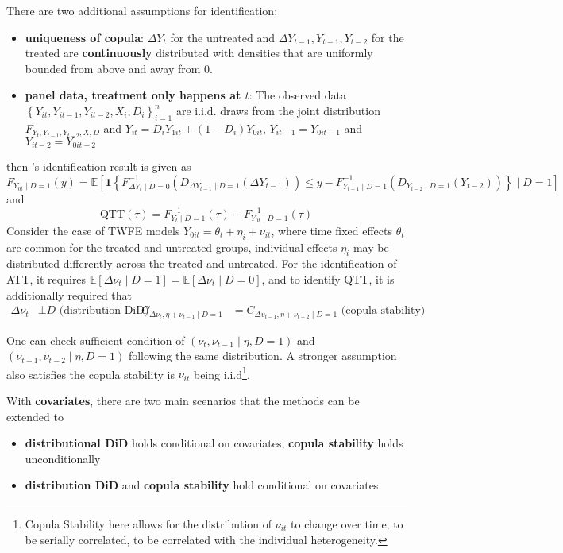 \documentclass[twoside]{article}
\begin{document}
There are two additional assumptions for identification:
\begin{itemize}
    \item \textbf{uniqueness of copula}: $\Delta Y_t$ for the untreated and $\Delta Y_{t-1},Y_{t-1},Y_{t-2}$ for the treated are \textbf{continuously} distributed with densities that are uniformly bounded from above and away from 0.
    \item \textbf{panel data, treatment only happens at $t$}: The observed data $\left\{ Y_{it},Y_{it-1},Y_{it-2},X_i,D_i \right\}^n_{i=1}$ are i.i.d. draws from the joint distribution $F_{Y_t,Y_{t-1},Y_{t-2},X,D}$ and $Y_{it}=D_iY_{1it}+(1-D_i)Y_{0it}$, $Y_{it-1}=Y_{0it-1}$ and $Y_{it-2}=Y_{0it-2}$
\end{itemize}

then \citet{callaway2019quantile}'s identification result is given as 
$$ F_{Y_{0t}\mid D=1}(y) = \mathbb{E}\left[\mathbf{1}\left\{ F^{-1}_{\Delta Y_t\mid D=0} \left(D_{\Delta Y_{t-1}\mid D=1} \left(\Delta Y_{t-1}\right)\right) \leq y-F^{-1}_{Y_{t-1}\mid D=1}\left(D_{Y_{t-2}\mid D=1}(Y_{t-2})\right) \right\} \mid D=1 \right] $$
and 
$$ \mathrm{QTT}(\tau) = F^{-1}_{Y_t\mid D=1}(\tau) - F^{-1}_{Y_{0t}\mid D=1}(\tau) $$
Consider the case of TWFE models $Y_{0it} = \theta_t + \eta_i + \nu_{it}$, where time fixed effects $\theta_t$ are common for the treated and untreated groups, individual effects $\eta_i$ may be distributed differently across the treated and untreated. For the identification of ATT, it requires $\mathbb{E}\left[\Delta \nu_t\mid D=1\right] = \mathbb{E}\left[\Delta \nu_t\mid D=0\right]$, and to identify QTT, 
it is additionally required that 
\begin{align*}
    \Delta \nu_t &\bot D \text{ (distribution DiD)}  & C_{\Delta \nu_t,\eta+\nu_{t-1}\mid D=1} &= C_{\Delta v_{t-1},\eta+\nu_{t-2}\mid D=1}\text{ (copula stability)}
\end{align*}

One can check sufficient condition of $\left(\nu_t,\nu_{t-1}\mid \eta,D=1\right)$ and $\left(\nu_{t-1},\nu_{t-2}\mid \eta,D=1\right)$ following the same distribution. A stronger assumption also satisfies the copula stability is $\nu_{it}$ being i.i.d\footnote{Copula Stability here allows for the distribution of $\nu_{it}$ to change over time, to be serially correlated, to be correlated with the individual heterogeneity.}.

With \textbf{covariates}, there are two main scenarios that the methods can be extended to
\begin{itemize}
    \item \textbf{distributional DiD} holds conditional on covariates, \textbf{copula stability} holds unconditionally
    \item \textbf{distribution DiD} and \textbf{copula stability} hold conditional on covariates
\end{itemize}
\end{document}
